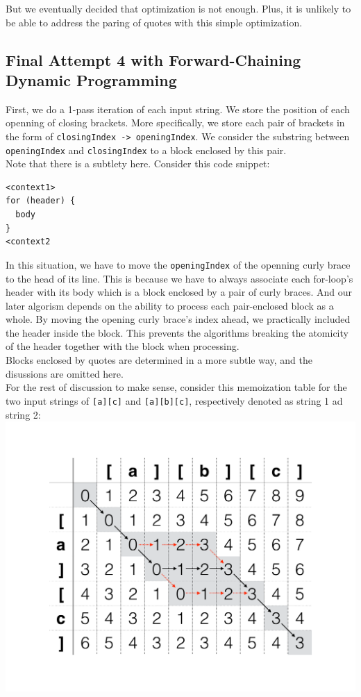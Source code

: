 \documentclass{article}
\begin{document}
But we eventually decided that optimization is not enough. Plus, it is unlikely to be able to address the paring of quotes with this simple optimization.

\subsection{Final Attempt 4 with Forward-Chaining Dynamic Programming}
First, we do a 1-pass iteration of each input string. We store the position of each openning of closing brackets. More specifically, we store each pair of brackets in the form of \texttt{closingIndex -> openingIndex}. We consider the substring between \texttt{openingIndex} and \texttt{closingIndex} to a block enclosed by this pair. \\

Note that there is a subtlety here. Consider this code snippet:
\begin{lstlisting}
<context1>
for (header) {
  body
}
<context2
\end{lstlisting}
In this situation, we have to move the \texttt{openingIndex} of the openning curly brace to the head of its line. This is because we have to always associate each for-loop's header with its body which is a block enclosed by a pair of curly braces. And our later algorism depends on the ability to process each pair-enclosed block as a whole. By moving the opening curly brace's index ahead, we practically included the header inside the block. This prevents the algorithms breaking the atomicity of the header together with the block when processing.\\

Blocks enclosed by quotes are determined in a more subtle way, and the disussions are omitted here. \\

For the rest of discussion to make sense, consider this memoization table for the two input strings of \texttt{[a][c]} and \texttt{[a][b][c]}, respectively denoted as string 1 ad string 2:\\
\includegraphics[scale=0.6,center]{2.pdf}\\
\end{document}
